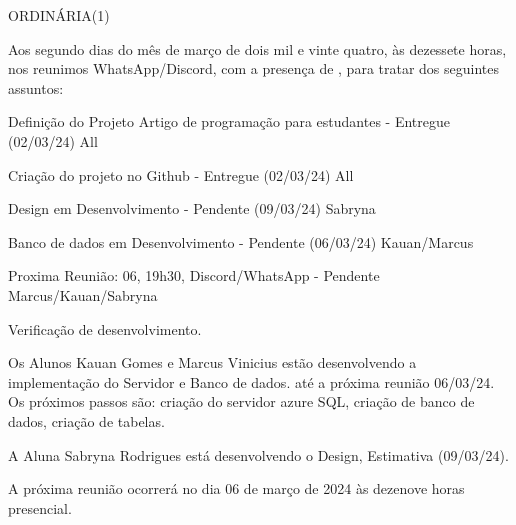 \documentclass[11pt,twoside]{ata}
\date{02 de março de 2024}
\begin{document}
\begin{reuniao}{ORDINÁRIA(1)}

    Aos segundo dias do mês de março de dois mil e vinte quatro, às dezessete horas, nos reunimos WhatsApp/Discord, com a presença de , para tratar dos seguintes assuntos:

    \begin{informes}
        \item Definição do Projeto Artigo de programação para estudantes - Entregue (02/03/24) All
        \item Criação do projeto no Github - Entregue (02/03/24) All
        \item Design em Desenvolvimento - Pendente (09/03/24) Sabryna
        \item Banco de dados em Desenvolvimento - Pendente (06/03/24) Kauan/Marcus        
        \item Proxima Reunião: 06, 19h30, Discord/WhatsApp - Pendente Marcus/Kauan/Sabryna 
    \end{informes}
 
    \begin{Assuntos}
        \item Verificação de desenvolvimento.
        \item Os Alunos Kauan Gomes e Marcus Vinicius estão desenvolvendo a implementação do Servidor e Banco de dados. até a próxima reunião 06/03/24. Os próximos passos são: criação do servidor azure SQL, criação de banco de dados, criação de tabelas.
        \item A Aluna Sabryna Rodrigues está desenvolvendo o Design, Estimativa (09/03/24).
        \item A próxima reunião ocorrerá no dia 06 de março de 2024 às dezenove horas presencial.
\end{Assuntos}
\end{reuniao}

\end{document}
